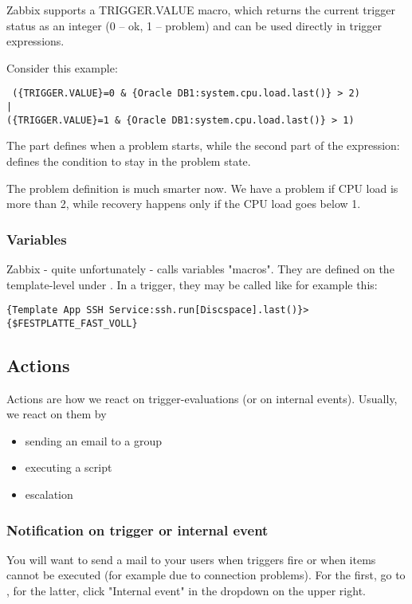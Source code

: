 Zabbix supports a {TRIGGER.VALUE} macro, which returns the current trigger status as an integer (0 – ok, 1 – problem) and can be used directly in trigger expressions.

 Consider this example: 
 \begin{lstlisting}
 ({TRIGGER.VALUE}=0 & {Oracle DB1:system.cpu.load.last()} > 2)
|
({TRIGGER.VALUE}=1 & {Oracle DB1:system.cpu.load.last()} > 1)
 \end{lstlisting}
 
 The  part defines when a problem starts, while the second part of the expression:  defines the condition to stay in the problem state.

The problem definition is much smarter now. We have a problem if CPU load is more than 2, while recovery happens only if the CPU load goes below 1.

\subsubsection{Variables}
Zabbix - quite unfortunately - calls variables "macros". They are defined on the template-level under . In a trigger, they may be called like for example this: 
\begin{lstlisting}
{Template App SSH Service:ssh.run[Discspace].last()}>{$FESTPLATTE_FAST_VOLL}
\end{lstlisting}


\subsection{Actions}
Actions are how we react on trigger-evaluations (or on internal events). Usually, we react on them by
\begin{itemize}
    \item sending an email to a group
    \item executing a script 
    \item escalation
\end{itemize}

\subsubsection{Notification on trigger or internal event}
You will want to send a mail to your users when triggers fire or when items cannot be executed (for example due to connection problems). For the first, go to , for the latter, click "Internal event" in the dropdown on the upper right. 

